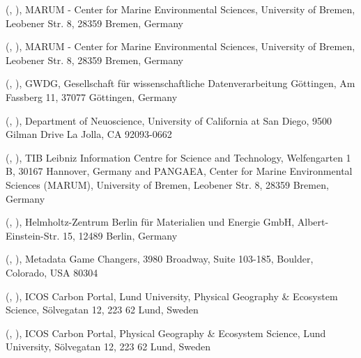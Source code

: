 \documentclass[a4paper,10pt,english]{sphinxmanual}
\begin{document}
 (, ),
MARUM - Center for Marine Environmental Sciences, University of Bremen, Leobener Str. 8, 28359 Bremen, Germany

 (, ),
MARUM - Center for Marine Environmental Sciences, University of Bremen, Leobener Str. 8, 28359 Bremen, Germany

 (, ),
GWDG, Gesellschaft für wissenschaftliche Datenverarbeitung Göttingen, Am
Fassberg 11, 37077 Göttingen, Germany

 (, ),
Department of Neuoscience, University of California at San Diego,
9500 Gilman Drive La Jolla, CA 92093-0662

 (, ),
TIB Leibniz Information Centre for Science and Technology, Welfengarten
1 B, 30167 Hannover, Germany and PANGAEA, Center for Marine
Environmental Sciences (MARUM), University of Bremen, Leobener Str. 8,
28359 Bremen, Germany

 (, ),
Helmholtz-Zentrum Berlin für Materialien und Energie GmbH,
Albert-Einstein-Str. 15, 12489 Berlin, Germany

 (, ),
Metadata Game Changers, 3980 Broadway, Suite 103-185, Boulder,
Colorado, USA 80304

 (, ),
ICOS Carbon Portal, Lund University, Physical Geography \& Ecosystem
Science, Sölvegatan 12, 223 62 Lund, Sweden

 (, ),
ICOS Carbon Portal, Physical Geography \& Ecosystem Science, Lund
University, Sölvegatan 12, 223 62 Lund, Sweden
\end{document}
